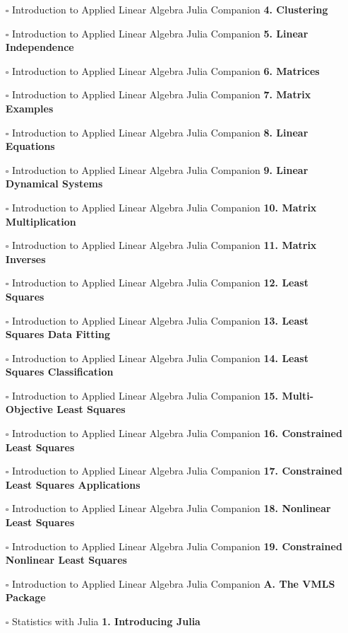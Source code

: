 \documentclass[a4, landscape, 12pt]{article}
\newcommand{\checkbox}{$\square$}%
\begin{document}
\begin{itemize}
{}
\item [\checkbox]  Introduction to Applied Linear Algebra Julia Companion \textbf{ 4. Clustering
}
\item [\checkbox]  Introduction to Applied Linear Algebra Julia Companion \textbf{ 5. Linear Independence
}
\item [\checkbox]  Introduction to Applied Linear Algebra Julia Companion \textbf{ 6. Matrices
}
\item [\checkbox]  Introduction to Applied Linear Algebra Julia Companion \textbf{ 7. Matrix Examples
}
\item [\checkbox]  Introduction to Applied Linear Algebra Julia Companion \textbf{ 8. Linear Equations
}
\item [\checkbox]  Introduction to Applied Linear Algebra Julia Companion \textbf{ 9. Linear Dynamical Systems
}
\item [\checkbox]  Introduction to Applied Linear Algebra Julia Companion \textbf{ 10. Matrix Multiplication
}
\item [\checkbox]  Introduction to Applied Linear Algebra Julia Companion \textbf{ 11. Matrix Inverses
}
\item [\checkbox]  Introduction to Applied Linear Algebra Julia Companion \textbf{ 12. Least Squares
}
\item [\checkbox]  Introduction to Applied Linear Algebra Julia Companion \textbf{ 13. Least Squares Data Fitting
}
\item [\checkbox]  Introduction to Applied Linear Algebra Julia Companion \textbf{ 14. Least Squares Classification
}
\item [\checkbox]  Introduction to Applied Linear Algebra Julia Companion \textbf{ 15. Multi-Objective Least Squares
}
\item [\checkbox]  Introduction to Applied Linear Algebra Julia Companion \textbf{ 16. Constrained Least Squares
}
\item [\checkbox]  Introduction to Applied Linear Algebra Julia Companion \textbf{ 17. Constrained Least Squares Applications
}
\item [\checkbox]  Introduction to Applied Linear Algebra Julia Companion \textbf{ 18. Nonlinear Least Squares
}
\item [\checkbox]  Introduction to Applied Linear Algebra Julia Companion \textbf{ 19. Constrained Nonlinear Least Squares
}
\item [\checkbox]  Introduction to Applied Linear Algebra Julia Companion \textbf{ A. The VMLS Package
}
\item [\checkbox]  Statistics with Julia \textbf{ 1. Introducing Julia
}
\end{itemize}
\end{document}
